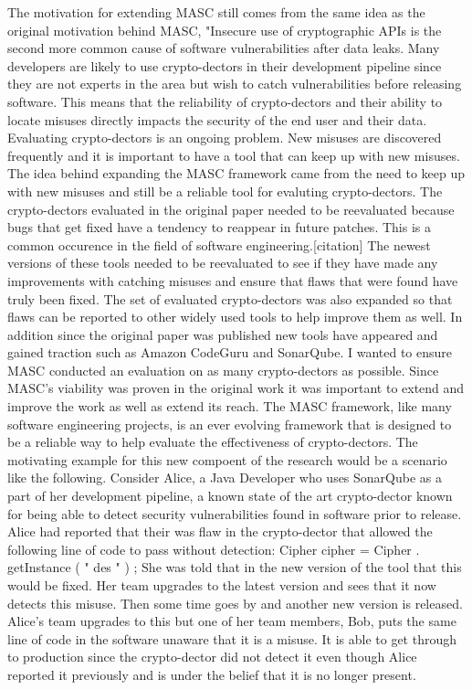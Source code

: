 The motivation for extending MASC still comes from the same idea as the original motivation behind MASC, "Insecure use of cryptographic APIs is the second more common cause of software vulnerabilities after data leaks. Many developers are likely to use crypto-dectors in their development pipeline since they are not experts in the area but wish to catch vulnerabilities before releasing software. This means that the reliability of crypto-dectors and their ability to locate misuses directly impacts the security of the end user and their data. Evaluating crypto-dectors is an ongoing problem. New misuses are discovered frequently and it is important to have a tool that can keep up with new misuses. The idea behind expanding the MASC framework came from the need to keep up with new misuses and still be a reliable tool for evaluting crypto-dectors. 
The crypto-dectors evaluated in the original paper needed to be reevaluated because bugs that get fixed have a tendency to reappear in future patches. This is a common occurence in the field of software engineering.[citation] The newest versions of these tools needed to be reevaluated to see if they have made any improvements with catching misuses and ensure that flaws that were found have truly been fixed. The set of evaluated crypto-dectors was also expanded so that flaws can be reported to other widely used tools to help improve them as well. In addition since the original paper was published new tools have appeared and gained traction such as Amazon CodeGuru and SonarQube. I wanted to ensure MASC conducted an evaluation on as many crypto-dectors as possible. Since MASC's viability was proven in the original work it was important to extend and improve the work as well as extend its reach. The MASC framework, like many software engineering projects, is an ever evolving framework that is designed to be a reliable way to help evaluate the effectiveness of crypto-dectors.
The motivating example for this new compoent of the research would be a scenario like the following. Consider Alice, a Java Developer who uses SonarQube as a part of her development pipeline, a known state of the art crypto-dector known for being able to detect security vulnerabilities found in software prior to release. Alice had reported that their was flaw in the crypto-dector that allowed the following line of code to pass without detection:
Cipher cipher = Cipher . getInstance ( " des " ) ;
She was told that in the new version of the tool that this would be fixed. Her team upgrades to the latest version and sees that it now detects this misuse. Then some time goes by and another new version is released. Alice's team upgrades to this but one of her team members, Bob, puts the same line of code in the software unaware that it is a misuse. It is able to get through to production since the crypto-dector did not detect it even though Alice reported it previously and is under the belief that it is no longer present.
